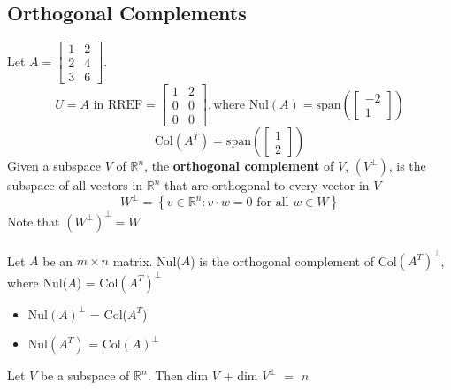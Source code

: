 \begin{enumerate}
\section{Orthogonal Complements}
Let $A = \begin{bmatrix} 1 & 2 \\ 2 & 4 \\ 3 & 6 \end{bmatrix}$.
\[
  U = \text{$A$ in RREF} = \begin{bmatrix} 1 & 2 \\ 0 & 0 \\ 0 & 0 \end{bmatrix}, \text{where }
  \text{Nul}(A) = \text{span}(\begin{bmatrix} -2 \\ 1 \end{bmatrix})
\]
\[
  \text{Col}(A^T) = \text{span}(\begin{bmatrix} 1 \\ 2 \end{bmatrix})
\]
Given a subspace $V$ of $\mathbb{R}^n$, the \textbf{orthogonal complement} of $V$, $(V^\perp)$,
is the subspace of all vectors in $\mathbb{R}^n$ that are orthogonal to every vector in $V$
\[
  W^\perp = \left\{ v \in \mathbb{R}^n : v \cdot w = 0 \text{ for all } w \in W\right\}
\] Note that $(W^\perp)^\perp = W$
\\\\
Let $A$ be an $m \times n$ matrix. Nul($A$) is the orthogonal complement of Col$(A^T)^\perp$, where Nul($A$) = Col$(A^T)^\perp$
\begin{itemize}
  \item Nul$(A)^\perp$ = Col($A^T$)
  \item Nul$(A^T)$ = Col$(A)^\perp$
\end{itemize}
Let $V$ be a subspace of $\mathbb{R}^n$. Then dim $V$ + dim $V^\perp$ $=$ $n$ 

\end{enumerate}

